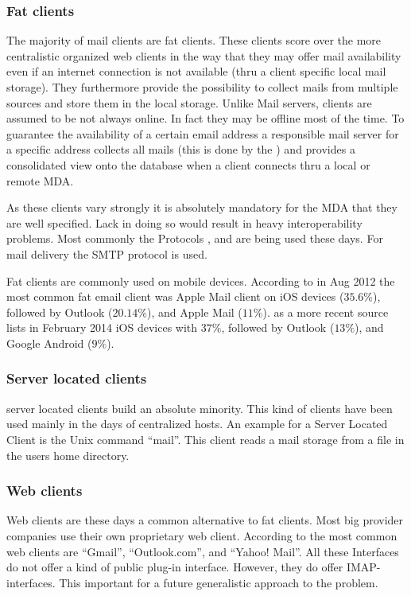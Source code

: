 \subsubsection{Fat clients}
The majority of mail clients are fat clients. These clients score over the more centralistic organized web clients in the way that they may offer mail availability even if an internet connection is not available (thru a client specific local mail storage). They furthermore provide the possibility to collect mails from multiple sources and store them in the local storage. Unlike Mail servers, clients are assumed to be not always online. In fact they may be offline most of the time. To guarantee the availability of a certain email address a responsible mail server for a specific address collects all mails (this is done by the ) and provides a consolidated view onto the database when a client connects thru a local or remote MDA.\par

As these clients vary strongly it is absolutely mandatory for the MDA that they are well specified. Lack in doing so would result in heavy interoperability problems. Most commonly the Protocols ,  and  are being used these days. For mail delivery the SMTP protocol is used. \par

Fat clients are commonly used on mobile devices. According to  \cite{clientDistribution} in Aug 2012 the most common fat email client was Apple Mail client on iOS devices ($35.6\%$), followed by Outlook ($20.14\%$), and Apple Mail ($11\%$). \cite{clientDistribution2} as a more recent source lists in February 2014 iOS devices with $37\%$, followed by Outlook ($13\%$), and  Google Android ($9\%$).

\subsubsection{Server located clients}
server located clients build an absolute minority. This kind of clients have been used mainly in the days of centralized hosts. An example for a Server Located Client is the Unix command "`mail"'. This client reads a mail storage from a file in the users home directory.

\subsubsection{Web clients}
Web clients are these days a common alternative to fat clients. Most big provider companies use their own proprietary web client. According to \cite{clientDistribution2} the most common web clients are "`Gmail"', "`Outlook.com"', and "`Yahoo! Mail"'. All these Interfaces do not offer a kind of public plug-in interface. However,  they do offer IMAP-interfaces. This important for a future generalistic approach to the problem.


